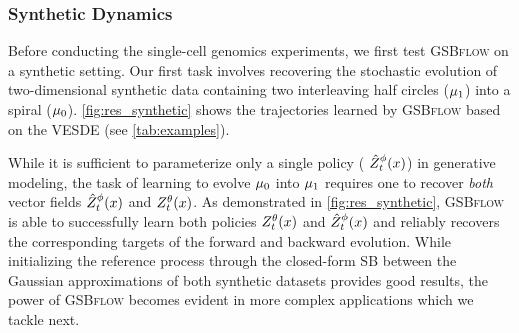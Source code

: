 \begin{table}[t]
    \caption{Evaluation of predictive performance w.r.t. the entropy-regularized Wasserstein distance $W_\varepsilon$ \citep{cuturi2013sinkhorn} of \textsc{GSBflow} and baselines on generating different single-cell datasets (using 3 runs).}
    \label{tab:exp_wasserstein_cells}
    \centering
{}
\end{table}

\subsubsection{Synthetic Dynamics} 
\label{sec:gsbflow_synthetic}

Before conducting the single-cell genomics experiments, we first test \textsc{GSBflow} on a synthetic setting. 
Our first task involves recovering the stochastic evolution of two-dimensional synthetic data containing two interleaving half circles ($\mu_1$) into a spiral ($\mu_0$). 
\cref{fig:res_synthetic} shows the trajectories learned by \textsc{GSBflow} based on the \acrshort{VESDE} (see \cref{tab:examples}). 

While it is sufficient to parameterize only a single policy ({\color{blue} $\SBb$}) in generative modeling, the task of learning to evolve $\mu_0$ into $\mu_1$ requires one to recover \emph{both} vector fields {\color{blue} $\SBb$} and {\color{pink} $\SBf$}.
As demonstrated in \cref{fig:res_synthetic}, \textsc{GSBflow} is able to successfully learn both policies {\color{pink} $\SBf$} and {\color{blue} $\SBb$} and reliably recovers the corresponding targets of the forward and backward evolution. While initializing the reference process through the closed-form SB between the Gaussian approximations of both synthetic datasets provides good results, the power of \textsc{GSBflow} becomes evident in more complex applications which we tackle next.

